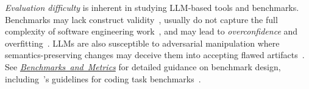 \documentclass[smallextended]{svjour3}
\newcommand{\benchmarksmetrics}{\hyperref[sec:use-suitable-baselines-benchmarks-and-metrics]{\mbox{\emph{Benchmarks and Metrics}}}\xspace}
\newcommand{\benchmarksmetrics}{\href{/guidelines/benchmarks-metrics/}{\emph{Benchmarks and Metrics}}\xspace}
\begin{document}
\emph{Evaluation difficulty} is inherent in studying LLM-based tools and benchmarks. Benchmarks may lack construct validity~\cite{DBLP:books/sp/24/RalphKAA24}, usually do not capture the full complexity of software engineering work~\cite{Chandra2025benchmarks}, and may lead to \emph{overconfidence} and overfitting~\cite{DBLP:journals/corr/abs-2412-03597}. LLMs are also susceptible to adversarial manipulation where semantics-preserving changes may deceive them into accepting flawed artifacts~\cite{DBLP:journals/corr/abs-2510-24367}. See \benchmarksmetrics for detailed guidance on benchmark design, including~\citeauthor{cao2025should}'s guidelines for coding task benchmarks~\cite{cao2025should}.
\end{document}
